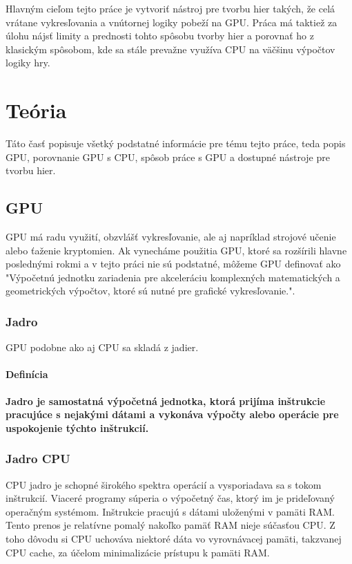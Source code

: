 Hlavným cieľom tejto práce je vytvoriť nástroj pre tvorbu hier takých, že celá vrátane vykresľovania a vnútornej logiky pobeží na GPU. Práca má taktiež za úlohu nájsť limity a prednosti tohto spôsobu tvorby hier a porovnať ho z klasickým spôsobom, kde sa stále prevažne využíva CPU na väčšinu výpočtov logiky hry.

\chapter{Teória}

Táto časť popisuje všetký podstatné informácie pre tému tejto práce, teda popis GPU, porovnanie GPU s CPU, spôsob práce s GPU a dostupné nástroje pre tvorbu hier.

\section{GPU}

GPU má radu využití, obzvlášť vykresľovanie, ale aj napríklad strojové učenie alebo ťaženie kryptomien. Ak vynecháme použitia GPU, ktoré sa rozšírili hlavne poslednými rokmi a v tejto práci nie sú podstatné, môžeme GPU definovať ako "Výpočetnú jednotku zariadenia pre akceleráciu komplexných matematických a geometrických výpočtov, ktoré sú nutné pre grafické vykresľovanie.". 

\subsection{Jadro}
GPU podobne ako aj CPU sa skladá z jadier. 

\subsubsection*{Definícia}
\bf Jadro \rm je samostatná výpočetná jednotka, ktorá prijíma inštrukcie pracujúce s nejakými dátami a vykonáva výpočty alebo operácie pre uspokojenie týchto inštrukcií.

\subsection*{Jadro CPU}
CPU jadro je schopné širokého spektra operácií a vysporiadava sa s tokom inštrukcií. Viaceré programy súperia o výpočetný čas, ktorý im je prideľovaný operačným systémom. Inštrukcie pracujú s dátami uloženými v pamäti RAM. Tento prenos je relatívne pomalý nakoľko pamäť RAM nieje súčasťou CPU. Z toho dôvodu si CPU uchováva niektoré dáta vo vyrovnávacej pamäti, takzvanej CPU cache, za účelom minimalizácie prístupu k pamäti RAM.

